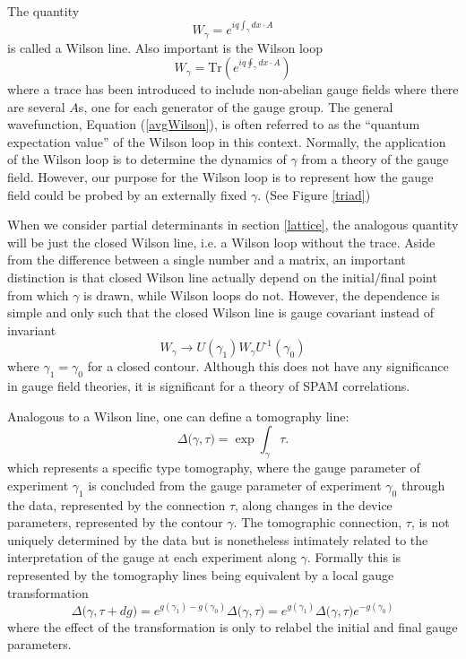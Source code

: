 \documentclass[pra, 10pt, notitlepage, twocolumn]{revtex4-1}
\newcommand{\Tr}{\mathrm{Tr}}
\newcommand{\inv}{\text{-1}}
\newcommand{\pref}[1]{(\ref{#1})}
\begin{document}
The quantity
\begin{equation}
	W_\gamma = e^{iq\!\int_\gamma \!dx\cdot A}
\end{equation}
is called a Wilson line.
Also important is the Wilson loop
\begin{equation}
	W_\gamma = \Tr \left(e^{iq\!\oint_\gamma \!dx\cdot A}\right)
\end{equation}
where a trace has been introduced to include non-abelian gauge fields where there are several $A$s, one for each generator of the gauge group.
The general wavefunction, Equation \pref{avgWilson}, is often referred to as the ``quantum expectation value'' of the Wilson loop in this context.
Normally, the application of the Wilson loop is to determine the dynamics of $\gamma$ from a theory of the gauge field.
However, our purpose for the Wilson loop is to represent how the gauge field could be probed by an externally fixed $\gamma$.  (See Figure \ref{triad})

When we consider partial determinants in section \ref{lattice}, the analogous quantity will be just the closed Wilson line, i.e. a Wilson loop without the trace.
Aside from the difference between a single number and a matrix,
an important distinction is that closed Wilson line actually depend on the initial/final point from which $\gamma$ is drawn, while Wilson loops do not.
However, the dependence is simple and only such that the closed Wilson line is gauge covariant instead of invariant
\begin{equation}\label{covar}
	W_\gamma \longrightarrow U(\gamma_1)W_\gamma U^\inv(\gamma_0)
\end{equation}
where $\gamma_1=\gamma_0$ for a closed contour.
Although this does not have any significance in gauge field theories, it is significant for a theory of SPAM correlations.



Analogous to a Wilson line, one can define a tomography line:
\begin{equation}\label{taugauge}
\Delta\big(\gamma,\tau\big) = \exp{\!\int_\gamma\!\tau}.
\end{equation}
which represents a specific type tomography, where the gauge parameter of experiment $\gamma_1$ is concluded from the gauge parameter of experiment $\gamma_0$
through the data, represented by the connection $\tau$, along changes in the device parameters, represented by the contour $\gamma$.
The tomographic connection, $\tau$, is not uniquely determined by the data but is nonetheless intimately related to the interpretation of the gauge at each experiment along $\gamma$.
Formally this is represented by the tomography lines being equivalent by a local gauge transformation
\begin{equation}
\Delta\big(\gamma,\tau+dg\big) = e^{g(\gamma_1)-g(\gamma_0)}\Delta\big(\gamma,\tau)= e^{g(\gamma_1)}\Delta\big(\gamma,\tau)e^{-g(\gamma_0)}
\end{equation}
where the effect of the transformation is only to relabel the initial and final gauge parameters.
\end{document}

